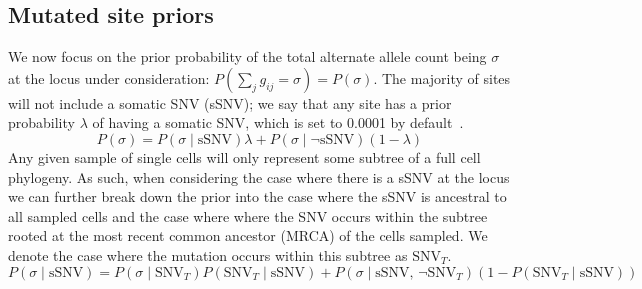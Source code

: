 \documentclass[../main.tex]{subfiles}
\begin{document}
\subsection{Mutated site priors}
We now focus on the prior probability of the total alternate allele count being $\sigma$ at the locus under consideration: $P(\sum_j g_{ij}=\sigma)=P(\sigma)$. The majority of sites will not include a somatic SNV (sSNV); we say that any site has a prior probability $\lambda$ of having a somatic SNV, which is set to 0.0001 by default~\cite{monovar, sciphi}. %
%
\begin{equation} \label{eq:overallprior}
P(\sigma)=P(\sigma\mid\text{sSNV})\lambda+P(\sigma\mid\neg\text{sSNV})(1-\lambda)
\end{equation}
Any given sample of single cells will only represent some subtree of a full cell phylogeny. As such, when considering the case where there is a sSNV at the locus we can further break down the prior into the case where the sSNV is ancestral to all sampled cells and the case where where the SNV occurs within the subtree rooted at the most recent common ancestor (MRCA) of the cells sampled. We denote the case where the mutation occurs within this subtree as $\text{SNV}_T$.
\begin{equation} \label{eq:somaticsnv}
P(\sigma\mid\text{sSNV})=P(\sigma\mid \text{SNV}_T)P(\text{SNV}_T\mid \text{sSNV})+P(\sigma\mid \text{sSNV},\,\neg\text{SNV}_T)(1-P(\text{SNV}_T\mid \text{sSNV}))
\end{equation}
\end{document}
